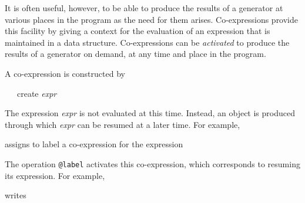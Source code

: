 

It is often useful, however, to be able to produce the results of a
generator at various places in the program as the need for them
arises. Co-expressions provide this facility by giving a context for
the evaluation of an expression that is maintained in a data
structure. Co-expressions can be \textit{activated }to produce the
results of a generator on demand, at any time and place in the
program.

A co-expression is constructed by

\ \ \ create \textit{expr}

The expression \textit{expr} is not evaluated at this time. Instead,
an object is produced through which \textit{expr} can be resumed at a
later time. For example,



\noindent assigns to label a co-expression for the expression



The operation \texttt{@label} activates this co-expression, which
corresponds to resuming its expression. For example,



\noindent
writes



